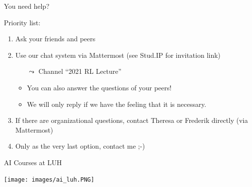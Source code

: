 \documentclass[aspectratio=169]{./latex_main/tntbeamer}  %
\begin{document}
\begin{frame}[c]{You need help?}
	
Priority list:
	\begin{enumerate}
		\item Ask your friends and peers
		\item Use our chat system via Mattermost (see Stud.IP for invitation link)
		\begin{itemize}
		    \item[$\leadsto$] Channel ``2021 RL Lecture''
			\item You can also answer the questions of your peers! 
			\item We will only reply if we have the feeling that it is necessary.
		\end{itemize}
		\item If there are organizational questions, contact Theresa or Frederik directly (via Mattermost)
		\item Only as the very last option, contact me ;-)
	\end{enumerate}
	
\end{frame}
\begin{frame}{AI Courses at LUH}
    
    \centering
    \texttt{[image: images/ai\_luh.PNG]}

\end{frame}
\end{document}
